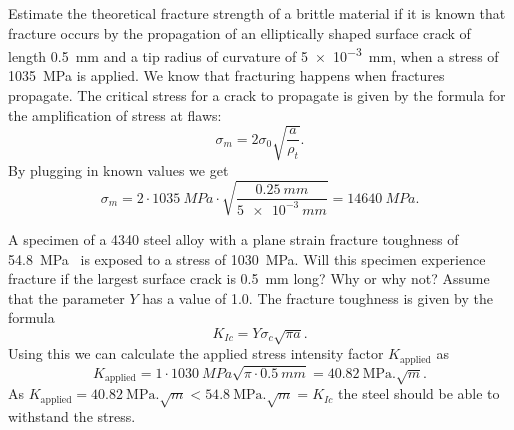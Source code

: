 
 Estimate the theoretical fracture strength of a brittle material if it is known that fracture occurs by the propagation of an elliptically shaped surface crack of length \qty{0,5}{mm} and a tip radius of curvature of \qty{5e-3}{mm}, when a stress of \qty{1035}{MPa} is applied.
\bigbreak
We know that fracturing happens when fractures propagate. The critical stress for a crack to propagate is given by the formula for the amplification of stress at flaws:
\[ 
\sigma_m = 2\sigma_0 \sqrt{\frac{a}{\rho_t}}
.\]
By plugging in known values we get
\[ 
\sigma_m = 2 \cdot \qty{1035}{MPa} \cdot \sqrt{\frac{\qty{0,25}{mm}}{\qty{5e-3}{mm}}} = \qty{14640}{MPa} 
.\]



 A specimen of a 4340 steel alloy with a plane strain fracture toughness of \qty{54,8}{\MPa.} is exposed to a stress of \qty{1030}{MPa}. Will this specimen experience fracture if the largest surface crack is \qty{0,5}{mm} long? Why or why not? Assume that the parameter $Y$ has a value of \num{1,0}.
\bigbreak
The fracture toughness is given by the formula
\[ 
K_{Ic} = Y \sigma_{c} \sqrt{\pi a}
.\]
Using this we can calculate the applied stress intensity factor $K_{\mathrm{applied}}$ as
\[ 
  K_{\mathrm{applied}} = 1 \cdot \qty{1030}{MPa} \sqrt{\pi \cdot \qty{0,5}{mm}} = \qty{40,82}{\MPa.\sqrt{m}} 
.\]
As $K_{\mathrm{applied}} = \qty{40,82}{\MPa.\sqrt{m}} < \qty{54,8}{\MPa.\sqrt{m}} = K_{Ic}$ the steel should be able to withstand the stress.




